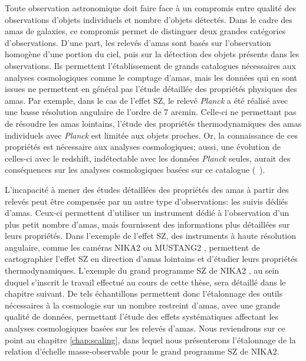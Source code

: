 Toute observation astronomique doit faire face à un compromis entre qualité des observations d'objets individuels et nombre d'objets détectés.
Dans le cadre des amas de galaxies, ce compromis permet de distinguer deux grandes catégories d'observations.
D'une part, les relevés d'amas sont basés sur l'observation homogène d'une portion du ciel, puis sur la détection des objets présents dans les observations.
Ils permettent l'établissement de grands catalogues nécessaires aux analyses cosmologiques comme le comptage d'amas, mais les données qui en sont issues ne permettent en général pas l'étude détaillée des propriétés physiques des amas.
Par exemple, dans le cas de l'effet SZ, le relevé \textit{Planck} \cite{planck_collaboration_planck_2016-2} a été réalisé avec une basse résolution angulaire de l'ordre de 7 arcmin.
Celle-ci ne permettant pas de résoudre les amas lointains, l'étude des propriétés thermodynamiques des amas individuels avec \textit{Planck} est limitée aux objets proches.
Or, la connaissance de ces propriétés est nécessaire aux analyses cosmologiques; aussi, une évolution de celles-ci avec le redshift, indétectable avec les données \textit{Planck} seules, aurait des conséquences sur les analyses cosmologiques basées sur ce catalogue (\eg\ \cite{ruppin_impact_2019}).

L'incapacité à mener des études détaillées des propriétés des amas à partir des relevés peut être compensée par un autre type d'observations: les suivis dédiés d'amas.
Ceux-ci permettent d'utiliser un instrument dédié à l'observation d'un plus petit nombre d'amas, mais fournissent des informations plus détaillées sur leurs propriétés.
Dans l'exemple de l'effet SZ, des instruments à haute résolution angulaire, comme les caméras NIKA2 \cite{adam_nika2_2018,perotto_calibration_2020} ou MUSTANG2 \cite{dicker_mustang2_2014}, permettent de cartographier l'effet SZ en direction d'amas lointains et d'étudier leurs propriétés thermodynamiques.
L'exemple du grand programme SZ de NIKA2 \cite{mayet_cluster_2020}, au sein duquel s'inscrit le travail effectué au cours de cette thèse, sera détaillé dans le chapitre suivant.
De tels échantillons permettent donc l'étalonnage des outils nécessaires à la cosmologie sur un nombre restreint d'amas, avec une grande qualité de données, permettant l'étude des effets systématiques affectant les analyses cosmologiques basées sur les relevés d'amas.
Nous reviendrons sur ce point au chapitre \ref{chap:scaling}, dans lequel nous présenterons l'étalonnage de la relation d'échelle masse-observable pour le grand programme SZ de NIKA2.

